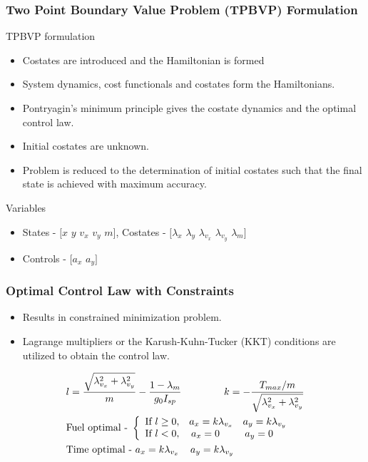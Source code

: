 \documentclass{beamer}
\begin{document}
\begin{frame}
	\frametitle{Two Point Boundary Value Problem (TPBVP) Formulation} 
	\vspace{-2.0mm}
	\begin{block}{TPBVP formulation}
		\vspace{-3mm}
		\begin{itemize}
		\item Costates are introduced and the Hamiltonian is formed
		\item System dynamics, cost functionals and costates form the Hamiltonians.
		\item Pontryagin's minimum principle gives the costate dynamics and the optimal control law.
		\item Initial costates are unknown.
		\item Problem is reduced to the determination of initial costates such that the final state is achieved with maximum accuracy.
		\end{itemize}
	\end{block}
	\vspace{-1.5mm}
	\begin{block}{Variables}
	\begin{itemize}
		\vspace{-3mm}
		\item States - $[x$ $y$ $v_x$ $v_y$ $m]$, Costates - $[\lambda_x$ $\lambda_y$ $\lambda_{v_x}$ $\lambda_{v_y}$ $\lambda_m]$
		\item Controls - $[a_x$ $a_y]$
	\end{itemize}
	\end{block}
\end{frame}

\begin{frame}
	\frametitle{Optimal Control Law with Constraints}
	\begin{itemize}
		\item Results in constrained minimization problem.
		\item Lagrange multipliers or the Karush-Kuhn-Tucker (KKT) conditions are utilized to obtain the control law.
	\end{itemize}
	\begin{align}
		&l=\frac{\sqrt{\lambda_{v_x}^2+\lambda_{v_y}^2}}{m}-\frac{1-\lambda_m}{g_0I_{sp}} \hspace{15mm} k=-\frac{T_{max}/m}{\sqrt{\lambda_{v_x}^2+\lambda_{v_y}^2}}\\
		&\text{Fuel optimal - }\left \{
		\begin{array}{ccc}
		\text{If } l\geq 0, &a_x=k\lambda_{v_x}  &a_y=k\lambda_{v_y}\\
		\text{If } l<0, &\hspace{-4mm}a_x=0  &\hspace{-4mm}a_y=0
		\end{array}
		\right.\\
		&\text{Time optimal - }a_x=k\lambda_{v_x}\hspace{4mm}a_y=k\lambda_{v_y}
	\end{align}
\end{frame}
\end{document}
